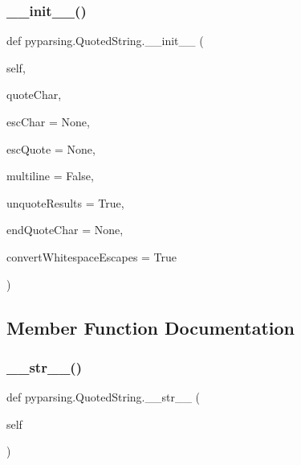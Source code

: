 \subsubsection{\texorpdfstring{\+\_\+\+\_\+init\+\_\+\+\_\+()}{\_\_init\_\_()}}
{\footnotesize\ttfamily def pyparsing.\+Quoted\+String.\+\_\+\+\_\+init\+\_\+\+\_\+ (\begin{DoxyParamCaption}\item[{}]{self,  }\item[{}]{quote\+Char,  }\item[{}]{esc\+Char = {\ttfamily None},  }\item[{}]{esc\+Quote = {\ttfamily None},  }\item[{}]{multiline = {\ttfamily False},  }\item[{}]{unquote\+Results = {\ttfamily True},  }\item[{}]{end\+Quote\+Char = {\ttfamily None},  }\item[{}]{convert\+Whitespace\+Escapes = {\ttfamily True} }\end{DoxyParamCaption})}



\subsection{Member Function Documentation}
\mbox{\label{classpyparsing_1_1QuotedString_a79accb54c4e676c5398d063450b141de}} 
\subsubsection{\texorpdfstring{\+\_\+\+\_\+str\+\_\+\+\_\+()}{\_\_str\_\_()}}
{\footnotesize\ttfamily def pyparsing.\+Quoted\+String.\+\_\+\+\_\+str\+\_\+\+\_\+ (\begin{DoxyParamCaption}\item[{}]{self }\end{DoxyParamCaption})}

\mbox{\label{classpyparsing_1_1QuotedString_a1c84c4b36842807dadafa1471de7658a}} 
